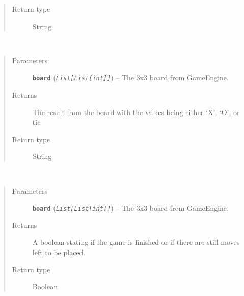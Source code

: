 \documentclass[letterpaper,10pt,english]{sphinxmanual}
\begin{document}
\begin{fulllineitems}
\begin{fulllineitems}
\begin{quote}
\begin{description}
\item[{Return type}] \leavevmode
String

\end{description}\end{quote}

\end{fulllineitems}


\begin{fulllineitems}
\label{index:GameEngine.GameEngine.getResult}~\begin{quote}\begin{description}
\item[{Parameters}] \leavevmode
\textbf{\texttt{board}} (\emph{\texttt{List{[}List{[}int{]}{]}}}) -- The 3x3 board from GameEngine.

\item[{Returns}] \leavevmode
The result from the board with the values being either `X', `O', or tie

\item[{Return type}] \leavevmode
String

\end{description}\end{quote}

\end{fulllineitems}


\begin{fulllineitems}
\label{index:GameEngine.GameEngine.isFinished}~\begin{quote}\begin{description}
\item[{Parameters}] \leavevmode
\textbf{\texttt{board}} (\emph{\texttt{List{[}List{[}int{]}{]}}}) -- The 3x3 board from GameEngine.

\item[{Returns}] \leavevmode
A boolean stating if the game is finished or if there are still moves left to be placed.

\item[{Return type}] \leavevmode
Boolean

\end{description}\end{quote}


\end{fulllineitems}
\end{fulllineitems}
\end{document}
